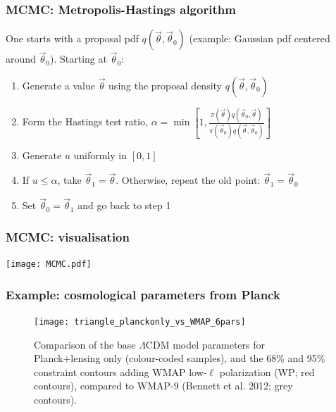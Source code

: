 \documentclass[9pt]{beamer}
\begin{document}
\begin{frame}
 \frametitle{MCMC: Metropolis-Hastings algorithm}
 
 One starts with a proposal pdf $q(\vec{\theta},\vec{\theta}_0)$ (example: Gaussian pdf centered around $\vec{\theta}_0$). Starting at $\vec{\theta}_0$:
 
 \begin{enumerate}
  \item<2-> Generate a value $\vec{\theta}$ using the proposal density $q(\vec{\theta},\vec{\theta}_0)$
  \item<3-> Form the Hastings test ratio, $\alpha = \min \left[ 1, \frac{\pi(\vec{\theta})q(\vec{\theta}_0,\vec{\theta})}{\pi(\vec{\theta}_0)q(\vec{\theta},\vec{\theta}_0)}\right]$
  \item<4-> Generate $u$ uniformly in $[0,1]$
  \item<5-> If $u \leq \alpha$, take $\vec{\theta}_1 = \vec{\theta}$. Otherwise, repeat the old point: $\vec{\theta}_1 = \vec{\theta}_0$
  \item<6-> Set $\vec{\theta}_0 = \vec{\theta}_1$ and go back to step 1
 \end{enumerate}
 

\end{frame}

\begin{frame}
 \frametitle{MCMC: visualisation}
 
 \centering
 \texttt{[image: MCMC.pdf]}
\end{frame}


\begin{frame}
 \frametitle{Example: cosmological parameters from Planck}
 
 \begin{figure}
 \centering
 \texttt{[image: triangle\_planckonly\_vs\_WMAP\_6pars]}
 
 \caption{\tiny Comparison of the base $\Lambda$CDM model parameters for Planck+lensing only (colour-coded samples), and the 68\% and 95\%
constraint contours adding WMAP low-$\ell$ polarization (WP; red contours), compared to WMAP-9 (Bennett et al. 2012; grey contours).
}
 \end{figure}

 
 
 
\end{frame}
\end{document}
